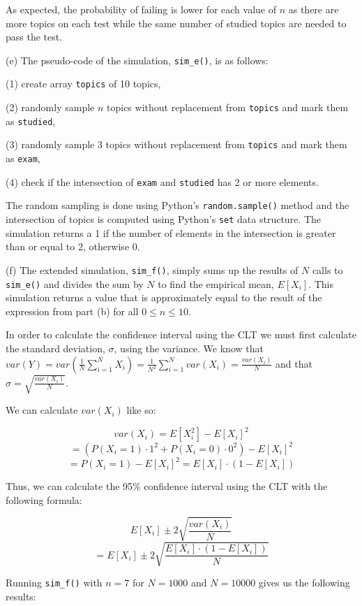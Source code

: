 \documentclass[10pt]{article}
\begin{document}
As expected, the probability of failing is lower for each value of $n$ as there are more topics on each test while the same number of studied topics are needed to pass the test.

\noindent (e) The pseudo-code of the simulation, \texttt{sim\_e()}, is as follows:

\indent\indent (1) create array \texttt{topics} of 10 topics,

\indent\indent (2) randomly sample $n$ topics without replacement from \texttt{topics} and mark them as \texttt{studied},

\indent\indent (3) randomly sample 3 topics without replacement from \texttt{topics} and mark them as \texttt{exam},

\indent\indent (4) check if the intersection of \texttt{exam} and \texttt{studied} has 2 or more elements.

The random sampling is done using Python's \texttt{random.sample()} method and the intersection of topics is computed using Python's \texttt{set} data structure. The simulation returns a 1 if the number of elements in the intersection is greater than or equal to 2, otherwise 0.

\noindent (f) The extended simulation, \texttt{sim\_f()}, simply sums up the results of $N$ calls to \texttt{sim\_e()} and divides the sum by $N$ to find the empirical mean, $E[X_i]$. This simulation returns a value that is approximately equal to the result of the expression from part (b) for all $0 \le n \le 10$.

In order to calculate the confidence interval using the CLT we must first calculate the standard deviation, $\sigma$, using the variance. We know that $var(Y) = var(\frac{1}{N}\sum_{i=1}^N X_i) = \frac{1}{N^2}\sum_{i=1}^N var(X_i) = \frac{var(X_i)}{N}$ and that $\sigma = \sqrt{\frac{var(X_i)}{N}}$.

We can calculate $var(X_i)$ like so:

$$var(X_i) = E[X_i^2] - E[X_i]^2$$
$$= (P(X_i = 1) \cdot 1^2 + P(X_i = 0) \cdot 0^2) - E[X_i]^2$$
$$= P(X_i = 1) - E[X_i]^2 = E[X_i] \cdot (1 - E[X_i])$$

Thus, we can calculate the 95\% confidence interval using the CLT with the following formula:

$$E[X_i] \pm 2 \sqrt{\frac{var(X_i)}{N}}$$
$$= E[X_i] \pm 2 \sqrt{\frac{E[X_i] \cdot (1 - E[X_i])}{N}}$$

Running \texttt{sim\_f()} with $n = 7$ for $N = 1000$ and $N = 10000$ gives us the following results:
\end{document}
